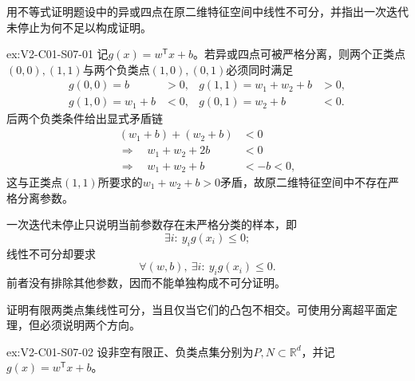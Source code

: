 \begin{SLChapterExercisePairSection}

\SLSourceBookExercises

\begin{exercise}\label{ex:V2-C01-S07-01}
用不等式证明题设中的异或四点在原二维特征空间中线性不可分，并指出一次迭代未停止为何不足以构成证明。
\end{exercise}
\ifSLFullEdition
{}\label{sol:V2-C01-S07-01}
\begin{chapterexercisesolution}{ex:V2-C01-S07-01}
记$g(x)=w^{\mathsf T}x+b$。若异或四点可被严格分离，则两个正类点$(0,0),(1,1)$与两个负类点$(1,0),(0,1)$必须同时满足
\[
\begin{aligned}
g(0,0)=b&>0, & g(1,1)=w_1+w_2+b&>0,\\
g(1,0)=w_1+b&<0, & g(0,1)=w_2+b&<0.
\end{aligned}
\]
后两个负类条件给出显式矛盾链
\[
\begin{aligned}
(w_1+b)+(w_2+b)&<0\\
\Longrightarrow\quad w_1+w_2+2b&<0\\
\Longrightarrow\quad w_1+w_2+b&<-b<0,
\end{aligned}
\]
这与正类点$(1,1)$所要求的$w_1+w_2+b>0$矛盾，故原二维特征空间中不存在严格分离参数。

一次迭代未停止只说明当前参数存在未严格分类的样本，即
\[
\exists i:\ y_i g(x_i)\leq0;
\]
线性不可分却要求
\[
\forall(w,b),\ \exists i:\ y_i g(x_i)\leq0.
\]
前者没有排除其他参数，因而不能单独构成不可分证明。
\end{chapterexercisesolution}
\fi

\begin{exercise}\label{ex:V2-C01-S07-02}
证明有限两类点集线性可分，当且仅当它们的凸包不相交。可使用分离超平面定理，但必须说明两个方向。
\end{exercise}
\ifSLFullEdition
{}\label{sol:V2-C01-S07-02}
\begin{chapterexercisesolution}{ex:V2-C01-S07-02}
设非空有限正、负类点集分别为$P,N\subset\mathbb R^d$，并记$g(x)=w^{\mathsf T}x+b$。


\end{chapterexercisesolution}
\end{SLChapterExercisePairSection}
